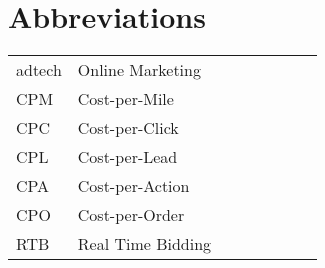 \chapter*{Abbreviations}

\begin{flushleft}
\begin{tabular}{l p{0.8\linewidth}}
adtech   & Online Marketing\\
CPM   & Cost-per-Mile\\
CPC   & Cost-per-Click\\
CPL   & Cost-per-Lead\\
CPA   & Cost-per-Action\\
CPO   & Cost-per-Order\\
RTB   & Real Time Bidding\\
\end{tabular}
\end{flushleft}

